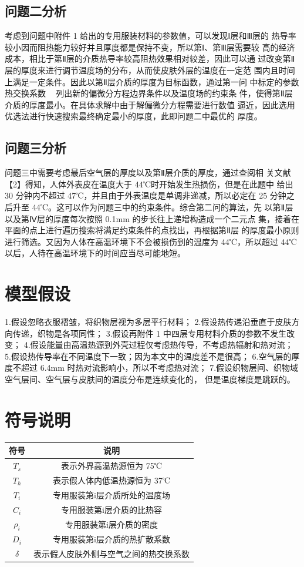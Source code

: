 \documentclass{article}
\begin{document}
	\subsection{问题二分析}
	考虑到问题中附件 1 给出的专用服装材料的参数值，可以发现Ⅰ层和Ⅲ层的
	热导率较小因而阻热能力较好并且厚度都是保持不变，所以第Ⅰ、第Ⅲ层需要较
	高的经济成本，相比于第Ⅱ层的介质热导率较高阻热效果相对较差，因此可以通
	过改变第Ⅱ层的厚度来进行调节温度场的分布，从而使皮肤外层的温度在一定范
	围内且时间上满足一定条件。因此以第Ⅱ层介质的厚度为目标函数，通过第一问
	中标定的参数热交换系数  ，列出新的偏微分方程边界条件以及温度场的约束条
	件，使得第Ⅱ层介质的厚度最小。在具体求解中由于解偏微分方程需要进行数值
	逼近，因此选用优选法进行快速搜索最终确定最小的厚度，此即问题二中最优的
	厚度。
	\subsection{问题三分析}
	问题三中需要考虑最后空气层的厚度以及第Ⅱ层介质的厚度，通过查阅相
	关文献【2】得知，人体外表皮在温度大于 44℃时开始发生热损伤，但是在此题中
	给出 30 分钟内不超过 47℃，并且由于外表温度是单调非递减，所以必定在 25
	分钟之后升至 44℃。这可以作为问题三中的约束条件。综合第二问的算法，先
	以第Ⅱ层以及第Ⅳ层的厚度每次按照 0.1mm 的步长往上递增构造成一个二元点
	集，接着在平面的点上进行遍历搜索将满足约束条件的点找出，再根据第Ⅱ层
	的厚度最小原则进行筛选。又因为人体在高温环境下不会被损伤到的温度为
	44℃，所以超过 44℃以后，人待在高温环境下的时间应当尽可能地短。
	
	
	\section{模型假设}
	1.假设忽略衣服褶皱，将织物层视为多层平行材料；
	2.假设热传递沿垂直于皮肤方向传递，织物是各项同性；
	3.假设再附件 1 中四层专用材料介质的参数不发生改变；
	4.假设能量由高温热源到外壳过程仅考虑热传导，不考虑热辐射和热对流；
	5.假设热传导率在不同温度下一致；因为本文中的温度差不是很高；
	6.空气层的厚度不超过 6.4mm 时热对流影响小，所以不考虑热对流；
	7.假设织物层间、织物域空气层间、空气层与皮肤间的温度分布是连续变化的，
	但是温度梯度是跳跃的。
	\section{符号说明}
	\begin{tabular}{|c|c|}
		\hline
		符号 & 说明 \\ 
		\hline 
		$T_{s}$& 表示外界高温热源恒为 75℃ \\ 
		
		$T_{h}$& 表示假人体内低温热源恒为 37℃ \\ 
		
		$T_{i}$& 专用服装第i层介质所处的温度场 \\ 
		
		$C_{i}$& 专用服装第i层介质的比热容 \\ 
		
		$\rho _{i}$& 专用服装第i层介质的密度 \\ 
		
		$D_{i}$& 专用服装第i层介质的热扩散系数 \\ 
		
		$\delta$ & 表示假人皮肤外侧与空气之间的热交换系数 \\ 
		\hline
	\end{tabular}
\end{document}
